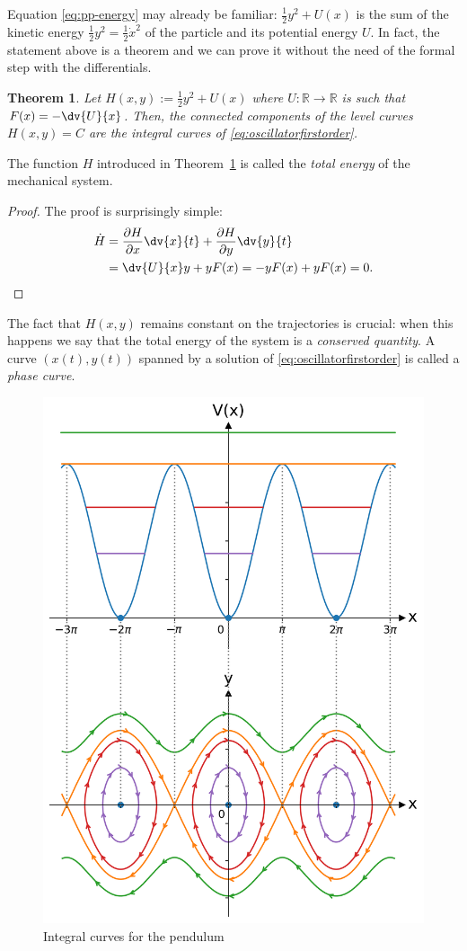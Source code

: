 \documentclass[english,fontsize=11pt,paper=b5]{scrbook}
\numberwithin{equation}{chapter}
\newtheorem{theorem}{Theorem}[chapter]
\theoremstyle{definition}
\newcommand{\emphidx}[1]{\index{#1}\emph{#1}}
\begin{document}
    Equation \eqref{eq:pp-energy} may already be familiar: $\frac12 y^2 + U(x)$ is the sum of the kinetic energy $\frac12 y^2 = \frac12 {\dot x}^2$ of the particle and its potential energy $U$. In fact, the statement above is a theorem and we can prove it without the need of the formal step with the differentials.

    \begin{theorem}\label{thm:ham1}
      Let $H(x, y) := \frac12 y^2 + U(x)$ where $U:\mathbb{R}\to\mathbb{R}$ is such that $F(x) = -\dv{U}{x}$.
      Then, the connected components of the level curves $H(x,y) = C$ are the integral curves of \eqref{eq:oscillatorfirstorder}.
    \end{theorem}
    The function $H$ introduced in Theorem~\ref{thm:ham1} is called the \emph{total energy} of the mechanical system.
    \begin{proof}
      The proof is surprisingly simple:
      \begin{align}
        \dot H & = \frac{\partial H}{\partial x}\dv{x}{t} + \frac{\partial H}{\partial y}\dv{y}{t} \\
               & = \dv{U}{x} y + y F(x)
               = -y F(x) + y F(x) = 0.
      \end{align}
    \end{proof}

    The fact that $H(x,y)$ remains constant on the trajectories is crucial: when this happens we say that the total energy of the system is a \emph{conserved quantity}.
    A curve $(x(t), y(t))$ spanned by a solution of \eqref{eq:oscillatorfirstorder} is called a \emphidx{phase curve}.

    \begin{figure}[htbp]
      \centering
      \includegraphics[width=.7\linewidth]{images/potential-curves-pendulum.pdf}
      \caption{Integral curves for the pendulum}
      \label{fig:pendulum}
    \end{figure}
\end{document}
